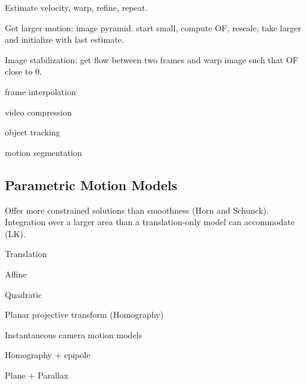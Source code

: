 \begin{definition}
  Estimate velocity, warp, refine, repeat.
\end{definition}

\begin{algorithm}
  Get larger motion: image pyramid. start small, compute OF, rescale, take larger and initialize with last estimate.
\end{algorithm}

\begin{definition}[Applications]
  \begin{itemize*}
    \item Image stabilization: get flow between two frames and warp image such that OF close to 0.
    \item frame interpolation
    \item video compression
    \item object tracking
    \item motion segmentation
  \end{itemize*}
\end{definition}

\subsection{Parametric Motion Models}
Offer more constrained solutions than smoothness (Horn and Schunck). Integration over a larger area than a translation-only model can accommodate (LK).

\begin{definition}[2D Models]
  \begin{itemize*}
    \item Translation
    \item Affine
    \item Quadratic
    \item Planar projective transform (Homography)
  \end{itemize*}
\end{definition}

\begin{definition}[3D Models]
  \begin{itemize*}
    \item Instantaneous camera motion models
    \item Homography + epipole
    \item Plane + Parallax
  \end{itemize*}
\end{definition}

